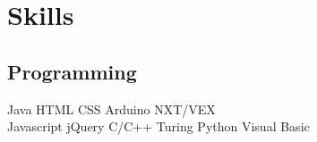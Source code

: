 \documentclass[]{deedy-resume-openfont}
\begin{document}
\begin{minipage}[t]{0.33\textwidth}




\section{Skills}
\subsection{Programming}
Java  \textbullet{} HTML \textbullet{} CSS \textbullet{} Arduino \textbullet{} NXT/VEX\\  %
\vspace{1mm}
Javascript  \textbullet{} jQuery \textbullet{} C/C++ \textbullet{} Turing \textbullet{} Python\textbullet{} Visual Basic\\
\sectionsep


\end{minipage}
\end{document}
